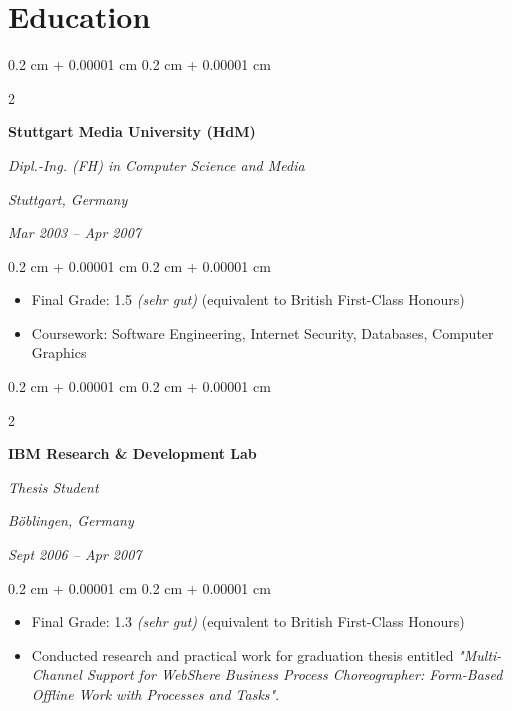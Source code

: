 \documentclass[10pt, a4paper]{article}
\newenvironment{highlights}{
    \begin{itemize}[
        topsep=0.10 cm,
        parsep=0.10 cm,
        partopsep=0pt,
        itemsep=0pt,
        leftmargin=0.4 cm + 10pt
    ]
}{
    \end{itemize}
} %
\newenvironment{onecolentry}{
    \begin{adjustwidth}{
        0.2 cm + 0.00001 cm
    }{
        0.2 cm + 0.00001 cm
    }
}{
    \end{adjustwidth}
} %
\newenvironment{twocolentry}[2][]{
    \onecolentry
    \def\secondColumn{#2}
    \setcolumnwidth{\fill, 8 cm}
    \begin{paracol}{2}
}{
    \switchcolumn \raggedleft \secondColumn
    \end{paracol}
    \endonecolentry
} %
\begin{document}
%
%
\section{Education}




\begin{twocolentry}{
        \textit{Stuttgart, Germany}

        \textit{Mar 2003 – Apr 2007}}
    \textbf{Stuttgart Media University (HdM)}

    \textit{Dipl.-Ing. (FH) in Computer Science and Media}
\end{twocolentry}

\vspace{0.10 cm}
\begin{onecolentry}
    \begin{highlights}
        \item Final Grade: 1.5 \textit{(sehr gut)} (equivalent to British First-Class Honours)
        \item Coursework: Software Engineering, Internet Security, Databases, Computer Graphics
    \end{highlights}
\end{onecolentry}

\vspace{0.2 cm}

\begin{twocolentry}{

        \textit{Böblingen, Germany}

        \textit{Sept 2006 – Apr 2007}}
    \textbf{IBM Research \& Development Lab}

    \textit{Thesis Student}
\end{twocolentry}

\vspace{0.10 cm}
\begin{onecolentry}
    \begin{highlights}
        \item Final Grade: 1.3 \textit{(sehr gut)} (equivalent to British First-Class Honours)
        \item Conducted research and practical work for graduation thesis entitled \textit{"Multi-Channel Support for WebShere Business Process Choreographer: Form-Based Offline Work with Processes and Tasks"}.
    \end{highlights}
\end{onecolentry}
\end{document}
